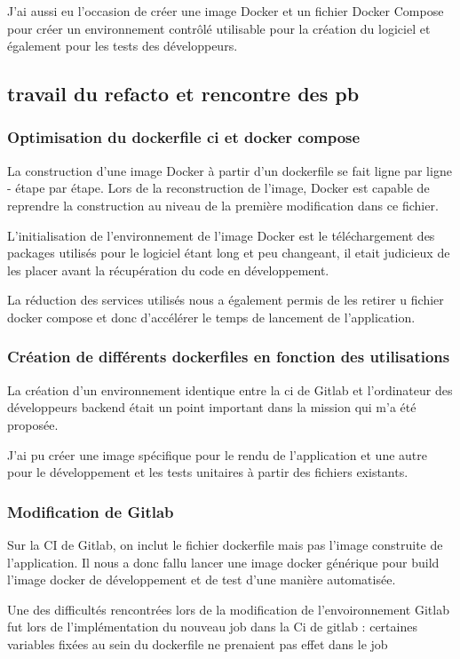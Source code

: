 J'ai aussi eu l'occasion de créer une image Docker et un fichier Docker Compose pour créer un environnement contrôlé utilisable pour la création du logiciel et également pour les tests des développeurs.

\subsection{travail du refacto et rencontre des pb}
\subsubsection{Optimisation du dockerfile ci et docker compose}
La construction d'une image Docker à partir d'un dockerfile se fait ligne par ligne - étape par étape.
Lors de la reconstruction de l'image, Docker est capable de reprendre la construction au niveau de la première modification dans ce fichier.

L'initialisation de l'environnement de l'image Docker est le téléchargement des packages utilisés pour le logiciel étant long et peu changeant, il etait judicieux de les placer avant la récupération du code en développement.

La réduction des services utilisés nous a également permis de les retirer u fichier docker compose et donc d'accélérer le temps de lancement de l'application.

\subsubsection{Création de différents dockerfiles en fonction des utilisations}
La création d'un environnement identique entre la ci de Gitlab et l'ordinateur des développeurs backend était un point important dans la mission qui m'a été proposée.

J'ai pu créer une image spécifique pour le rendu de l'application et une autre pour le développement et les tests unitaires à partir des fichiers existants.

\subsubsection{Modification de Gitlab}
Sur la CI de Gitlab, on inclut le fichier dockerfile mais pas l'image construite de l'application.
Il nous a donc fallu lancer une image docker générique pour build l'image docker de développement et de test d'une manière automatisée.

Une des difficultés rencontrées lors de la modification de l'envoironnement Gitlab fut lors de l'implémentation du nouveau job dans la Ci de gitlab : certaines variables fixées au sein du dockerfile ne prenaient pas effet dans le job 


